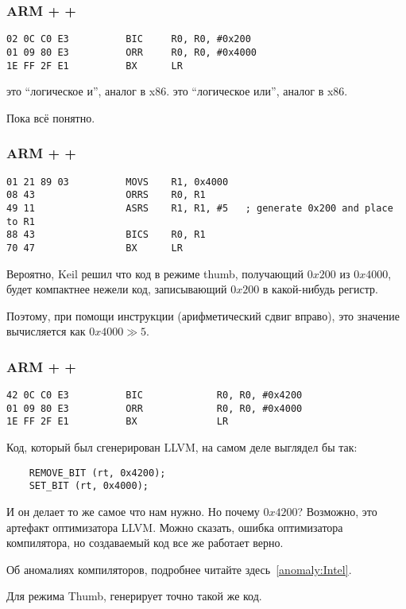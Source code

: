 \subsubsection{ARM + \OptimizingKeil + \ARMMode}

\begin{lstlisting}[caption=\OptimizingKeil + \ARMMode]
02 0C C0 E3          BIC     R0, R0, #0x200
01 09 80 E3          ORR     R0, R0, #0x4000
1E FF 2F E1          BX      LR
\end{lstlisting}

 это ``логическое и'', аналог \AND в x86.  это ``логическое или'', аналог \OR в x86.

Пока всё понятно.

\subsubsection{ARM + \OptimizingKeil + \ThumbMode}

\begin{lstlisting}[caption=\OptimizingKeil + \ThumbMode]
01 21 89 03          MOVS    R1, 0x4000
08 43                ORRS    R0, R1
49 11                ASRS    R1, R1, #5   ; generate 0x200 and place to R1
88 43                BICS    R0, R1
70 47                BX      LR
\end{lstlisting}

Вероятно, Keil решил что код в режиме thumb, получающий $0x200$ из $0x4000$, будет компактнее нежели код, 
записывающий $0x200$ в какой-нибудь регистр. 

Поэтому, при помощи инструкции  (арифметический сдвиг вправо),
это значение вычисляется как $0x4000 \gg 5$.

\label{anomaly:LLVM}
\subsubsection{ARM + \OptimizingXcode + \ARMMode}

\begin{lstlisting}[caption=\OptimizingXcode + \ARMMode]
42 0C C0 E3          BIC             R0, R0, #0x4200
01 09 80 E3          ORR             R0, R0, #0x4000
1E FF 2F E1          BX              LR
\end{lstlisting}

Код, который был сгенерирован LLVM, на самом деле выглядел бы так:

\begin{lstlisting}
    REMOVE_BIT (rt, 0x4200);
    SET_BIT (rt, 0x4000);
\end{lstlisting}

И он делает то же самое что нам нужно. Но почему $0x4200$? Возможно, это артефакт оптимизатора LLVM. 
Можно сказать, ошибка оптимизатора компилятора, но создаваемый код все же работает верно.

Об аномалиях компиляторов, подробнее читайте здесь~\ref{anomaly:Intel}.

Для режима Thumb, \OptimizingXcode генерирует точно такой же код.

